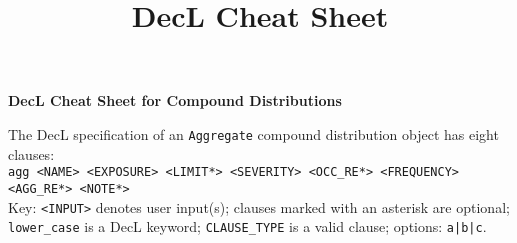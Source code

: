 


%
%
%

% 
\title{DecL Cheat Sheet}






{\huge{\bf DecL Cheat Sheet for Compound Distributions}}

\raggedright The DecL specification of an \texttt{Aggregate} compound distribution object has eight clauses: \\
\texttt{agg <NAME> <EXPOSURE> <LIMIT*> <SEVERITY> <OCC\_RE*> <FREQUENCY> <AGG\_RE*> <NOTE*>} \\
Key: \texttt{<INPUT>} denotes user input(s); clauses marked with an asterisk are optional; \texttt{lower\_case} is a DecL keyword; \texttt{CLAUSE\_TYPE} is a valid clause; options: \texttt{a|b|c}.


